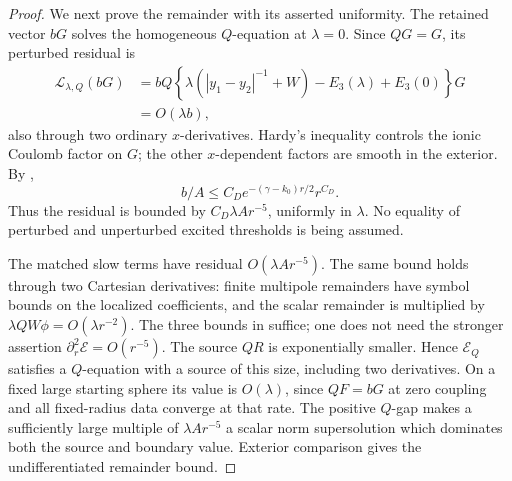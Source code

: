 \begin{proof}
We next prove the remainder with its asserted uniformity.
The retained vector \(bG\) solves the homogeneous \(Q\)-equation
at \(\lambda=0\).  Since \(QG=G\), its perturbed residual is
\begin{equation}
 \begin{split}
 \mathcal L_{\lambda,Q}(bG)
 &=bQ\left\{\lambda\left(|y_1-y_2|^{-1}+W\right)
                 -E_3(\lambda)+E_3(0)\right\}G\\
 &=O(\lambda b),
 \end{split}
 \label{eq:fast-channel-residual}
\end{equation}
also through two ordinary \(x\)-derivatives.
Hardy's inequality controls the ionic Coulomb factor on \(G\);
the other \(x\)-dependent factors are smooth in the exterior.
By ,
\begin{equation}
 b/A\leq C_D e^{-(\gamma-k_0)r/2}r^{C_D}.
 \label{eq:fast-term-absorption}
\end{equation}
Thus the residual is bounded by \(C_D\lambda Ar^{-5}\), uniformly
in \(\lambda\).  No equality of perturbed and unperturbed excited
thresholds is being assumed.

The matched slow terms have residual \(O(\lambda Ar^{-5})\).
The same bound holds through two Cartesian derivatives:
finite multipole remainders have symbol bounds on the localized
coefficients, and the scalar remainder is multiplied by
\(\lambda QW\phi=O(\lambda r^{-2})\).
The three bounds in  suffice;
one does not need the stronger assertion
\(\partial_r^2\mathcal E=O(r^{-5})\).
The source \(QR\) is exponentially smaller.
Hence \(\mathcal E_Q\) satisfies a \(Q\)-equation with a source
of this size, including two derivatives.  On a fixed large
starting sphere its value is \(O(\lambda)\), since \(QF=bG\)
at zero coupling and all fixed-radius data converge at that rate.
The positive \(Q\)-gap makes a sufficiently large multiple of
\(\lambda Ar^{-5}\) a scalar norm supersolution which dominates
both the source and boundary value.  Exterior comparison gives
the undifferentiated remainder bound.


\end{proof}
